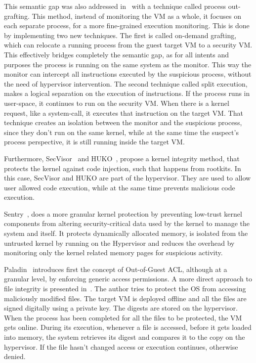 \par This semantic gap was also addressed in~\cite{srinivasan2011process} with a technique called process out-grafting. This method, instead of monitoring the \ac{VM} as a whole, it focuses on each separate process, for a more fine-grained execution monitoring. This is done by implementing two new techniques. The first is called on-demand grafting, which can relocate a running process from the guest target \ac{VM} to a security \ac{VM}. This effectively bridges completely the semantic gap, as for all intents and purposes the process is running on the same system as the monitor. This way the monitor can intercept all instructions executed by the suspicious process, without the need of hypervisor intervention. The second technique called split execution, makes a logical separation on the execution of instructions. If the process runs in user-space, it continues to run on the security \ac{VM}. When there is a kernel request, like a system-call, it executes that instruction on the target \ac{VM}. That technique creates an isolation between the monitor and the suspicious process, since they don’t run on the same kernel, while at the same time the suspect’s process perspective, it is still running inside the target \ac{VM}. 

\par Furthermore, SecVisor~\cite{seshadri2007secvisor} and HUKO~\cite{xiong2011practical}, propose a kernel integrity method, that protects the kernel against code injection, such that happens from rootkits. In this case, SecVisor and HUKO are part of the hypervisor. They are used to allow user allowed code execution, while at the same time prevents malicious code execution.


\par Sentry~\cite{srivastava2012efficient}, does a more granular kernel protection by preventing low-trust kernel components from altering security-critical data used by the kernel to manage the system and itself. It protects dynamically allocated memory, is isolated from the untrusted kernel by running on the Hypervisor and reduces the overhead by monitoring only the kernel related memory pages for suspicious activity.


\par Paladin~\cite{baliga2008automated} introduces first the concept of Out-of-Guest \ac{ACL}, although at a granular level, by enforcing generic access permissions. A more direct approach to file integrity is presented in~\cite{nasab2012security}. The author tries to protect the \ac{OS} from accessing maliciously modified files. The target \ac{VM} is deployed offline and all the files are signed digitally using a private key. The digests are stored on the hypervisor. When the process has been completed for all the files to be protected, the \ac{VM} gets online. During its execution, whenever a file is accessed, before it gets loaded into memory, the system retrieves its digest and compares it to the copy on the hypervisor. If the file hasn’t changed access or execution continues, otherwise denied.

